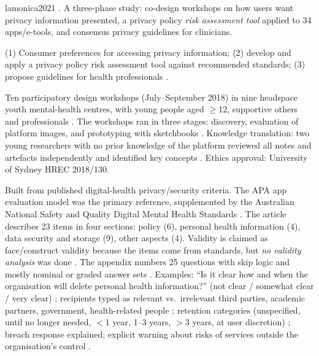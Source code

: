 \begin{papercard}{lamonica2021}
    . A three-phase study: co-design workshops on how users want privacy information presented, a privacy policy \emph{risk assessment tool} applied to 34 apps/e-tools, and consensus privacy guidelines for clinicians.

 (1) Consumer preferences for accessing privacy information; (2) develop and apply a privacy policy risk assessment tool against recommended standards; (3) propose guidelines for health professionals .

 Ten participatory design workshops (July--September 2018) in nine headspace youth mental-health centres, with young people aged $\geq$12, supportive others and professionals . The workshops ran in three stages: discovery, evaluation of platform images, and prototyping with sketchbooks . Knowledge translation: two young researchers with no prior knowledge of the platform reviewed all notes and artefacts independently and identified key concepts . Ethics approval: University of Sydney HREC 2018/130.

 Built from published digital-health privacy/security criteria. The APA app evaluation model was the primary reference, supplemented by the Australian National Safety and Quality Digital Mental Health Standards . The article describes 23 items in four sections: policy (6), personal health information (4), data security and storage (9), other aspects (4). Validity is claimed as face/construct validity because the items come from standards, but \emph{no validity analysis} was done . The appendix numbers 25 questions with skip logic and mostly nominal or graded answer sets . Examples: ``Is it clear how and when the organisation will delete personal health information?'' (not clear / somewhat clear / very clear) ; recipients typed as relevant vs.\ irrelevant third parties, academic partners, government, health-related people ; retention categories (unspecified, until no longer needed, $<$1 year, 1--3 years, $>$3 years, at user discretion) ; breach response explained; explicit warning about risks of services outside the organisation's control .


\end{papercard}
